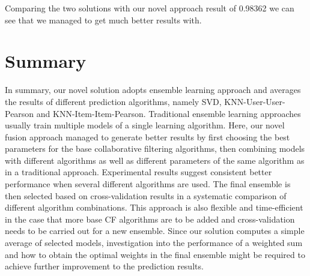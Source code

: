 \documentclass[10pt,conference,compsocconf]{IEEEtran}
\begin{document}
Comparing the two solutions with our novel approach result of 0.98362 we can see that we managed to get much better results with.

\section{Summary}
In summary, our novel solution adopts ensemble learning approach and averages the results of different prediction algorithms, namely SVD, KNN-User-User-Pearson and KNN-Item-Item-Pearson. Traditional ensemble learning approaches usually train multiple models of a single learning algorithm. Here, our novel fusion approach managed to generate better results by first choosing the best parameters for the base collaborative filtering algorithms, then combining models with different algorithms as well as different parameters of the same algorithm as in a traditional approach. Experimental results suggest consistent better performance when several different algorithms are used. The final ensemble is then selected based on  cross-validation results in a systematic comparison of different algorithm combinations. 
This approach is also flexible and time-efficient in the case that more base CF algorithms are to be added and cross-validation needs to be carried out for a new ensemble. 
Since our solution computes a simple average of selected models, investigation into the performance of a weighted sum and how to obtain the optimal weights in the final ensemble might be required to achieve further improvement to the prediction results.

\nocite{*}


\end{document}
